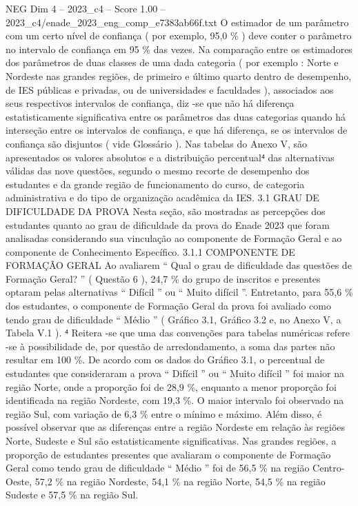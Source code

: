 \begin{textsample}{NEG Dim 4 – 2023\_c4 – Score 1.00 – 2023\_c4/enade\_2023\_eng\_comp\_e7383ab66f.txt}
O estimador de um parâmetro com um certo nível de confiança ( por exemplo, 95,0 \% ) deve conter o parâmetro no intervalo de confiança em 95 \% das vezes.
Na comparação entre os estimadores dos parâmetros de duas classes de uma dada categoria ( por exemplo : Norte e Nordeste nas grandes regiões, de primeiro e último quarto dentro de desempenho, de IES públicas e privadas, ou de universidades e faculdades ), associados aos seus respectivos intervalos de confiança, diz -se que não há diferença estatisticamente significativa entre os parâmetros das duas categorias quando há interseção entre os intervalos de confiança, e que há diferença, se os intervalos de confiança são disjuntos ( vide Glossário ).
Nas tabelas do Anexo V, são apresentados os valores absolutos e a distribuição percentual⁴ das alternativas válidas das nove questões, segundo o mesmo recorte de desempenho dos estudantes e da grande região de funcionamento do curso, de categoria administrativa e do tipo de organização acadêmica da IES. 3.1 GRAU DE DIFICULDADE DA PROVA Nesta seção, são mostradas as percepções dos estudantes quanto ao grau de dificuldade da prova do Enade 2023 que foram analisadas considerando sua vinculação ao componente de Formação Geral e ao componente de Conhecimento Específico. 3.1.1 COMPONENTE DE FORMAÇÃO GERAL Ao avaliarem “ Qual o grau de dificuldade das questões de Formação Geral? ” ( Questão 6 ), 24,7 \% do grupo de inscritos e presentes optaram pelas alternativas “ Difícil ” ou “ Muito difícil ”.
Entretanto, para 55,6 \% dos estudantes, o componente de Formação Geral da prova foi avaliado como tendo grau de dificuldade “ Médio ” ( Gráfico 3.1, Gráfico 3.2 e, no Anexo V, a Tabela V.1 ). ⁴ Reitera -se que uma das convenções para tabelas numéricas refere -se à possibilidade de, por questão de arredondamento, a soma das partes não resultar em 100 \%.
De acordo com os dados do Gráfico 3.1, o percentual de estudantes que consideraram a prova “ Difícil ” ou “ Muito difícil ” foi maior na região Norte, onde a proporção foi de 28,9 \%, enquanto a menor proporção foi identificada na região Nordeste, com 19,3 \%.
O maior intervalo foi observado na região Sul, com variação de 6,3 \% entre o mínimo e máximo.
Além disso, é possível observar que as diferenças entre a região Nordeste em relação às regiões Norte, Sudeste e Sul são estatisticamente significativas.
Nas grandes regiões, a proporção de estudantes presentes que avaliaram o componente de Formação Geral como tendo grau de dificuldade “ Médio ” foi de 56,5 \% na região Centro-Oeste, 57,2 \% na região Nordeste, 54,1 \% na região Norte, 54,5 \% na região Sudeste e 57,5 \% na região Sul.

\end{textsample}
